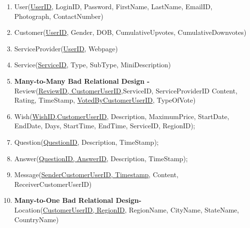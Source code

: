 \documentclass[a4paper]{article}
\begin{document}
\begin{enumerate}

\item User(\underline{UserID}, LoginID, Password, FirstName, LastName, EmailID, Photograph, ContactNumber)

\item Customer(\underline{UserID}, Gender, DOB, CumulativeUpvotes, CumulativeDownvotes)

\item ServiceProvider(\underline{UserID}, Webpage)

\item Service(\underline{ServiceID}, Type, SubType, MiniDescription)

\item  \textbf{Many-to-Many Bad Relational Design -}\\  Review(\underline{ReviewID, CustomerUserID},ServiceID, ServiceProviderID Content, Rating, TimeStamp, \underline{VotedByCustomerUserID}, TypeOfVote)

\item Wish(\underline{WishID,CustomerUserID}, Description, MaximumPrice, StartDate, EndDate, Days, StartTime, EndTime, ServiceID, RegionID);

\item Question(\underline{QuestionID}, Description, TimeStamp);

\item Answer(\underline{QuestionID, AnswerID}, Description, TimeStamp);

\item Message(\underline {SenderCustomerUserID, Timestamp}, Content, ReceiverCustomerUserID)

\item \textbf{Many-to-One Bad Relational Design- } \\ Location(\underline{CustomerUserID, RegionID}, RegionName, CityName, StateName, CountryName) 
\end{enumerate}
\end{document}
